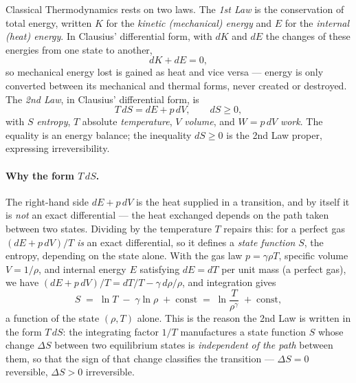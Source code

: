 Classical Thermodynamics rests on two laws. The \emph{1st Law} is the
conservation of total energy, written $K$ for the \emph{kinetic (mechanical)
energy} and $E$ for the \emph{internal (heat) energy}. In Clausius' differential
form, with $dK$ and $dE$ the changes of these energies from one state to
another,
\begin{equation}\label{eq:classical1st}
dK + dE = 0,
\end{equation}
so mechanical energy lost is gained as heat and vice versa --- energy is
only converted between its mechanical and thermal forms, never created or
destroyed. The \emph{2nd Law}, in Clausius' differential form, is
\begin{equation}\label{eq:classical2nd-essence}
T\,dS = dE + p\,dV, \qquad dS \ge 0,
\end{equation}
with $S$ \emph{entropy}, $T$ absolute \emph{temperature}, $V$ \emph{volume}, and
$W = p\,dV$ \emph{work}. The equality is an energy balance; the inequality
$dS \ge 0$ is the 2nd Law proper, expressing irreversibility.

\paragraph{Why the form $T\,dS$.}
The right-hand side $dE + p\,dV$ is the heat supplied in a transition, and by
itself it is \emph{not} an exact differential --- the heat exchanged depends on
the path taken between two states. Dividing by the temperature $T$ repairs this:
for a perfect gas $(dE + p\,dV)/T$ \emph{is} an exact differential, so it defines
a \emph{state function} $S$, the entropy, depending on the state alone. With the
gas law $p = \gamma\rho T$, specific volume $V = 1/\rho$, and internal energy $E$
satisfying $dE = dT$ per unit mass (a perfect gas), we have
$(dE + p\,dV)/T = dT/T - \gamma\,d\rho/\rho$, and integration gives
\begin{equation}\label{eq:S-perfectgas}
S \;=\; \ln T \;-\; \gamma\ln\rho \;+\; \text{const} \;=\; \ln\!\frac{T}{\rho^{\gamma}} \;+\; \text{const},
\end{equation}
a function of the state $(\rho,T)$ alone. This is the reason the 2nd Law is
written in the form $T\,dS$: the integrating factor $1/T$ manufactures a state
function $S$ whose change $\Delta S$ between two equilibrium states is
\emph{independent of the path} between them, so that the sign of that change
classifies the transition --- $\Delta S = 0$ reversible, $\Delta S > 0$
irreversible.

